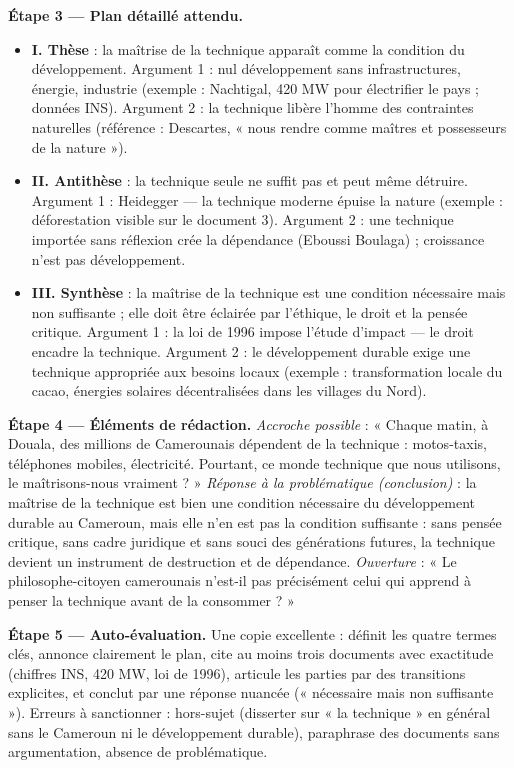 \documentclass[11pt]{article}
\begin{document}
\begin{exoresolu}
\textbf{Étape 3 — Plan détaillé attendu.}
\begin{itemize}
\item \textbf{I. Thèse} : la maîtrise de la technique apparaît comme la condition du développement. Argument 1 : nul développement sans infrastructures, énergie, industrie (exemple : Nachtigal, 420 MW pour électrifier le pays ; données INS). Argument 2 : la technique libère l'homme des contraintes naturelles (référence : Descartes, « nous rendre comme maîtres et possesseurs de la nature »).
\item \textbf{II. Antithèse} : la technique seule ne suffit pas et peut même détruire. Argument 1 : Heidegger — la technique moderne épuise la nature (exemple : déforestation visible sur le document 3). Argument 2 : une technique importée sans réflexion crée la dépendance (Eboussi Boulaga) ; croissance n'est pas développement.
\item \textbf{III. Synthèse} : la maîtrise de la technique est une condition nécessaire mais non suffisante ; elle doit être éclairée par l'éthique, le droit et la pensée critique. Argument 1 : la loi de 1996 impose l'étude d'impact — le droit encadre la technique. Argument 2 : le développement durable exige une technique appropriée aux besoins locaux (exemple : transformation locale du cacao, énergies solaires décentralisées dans les villages du Nord).
\end{itemize}

\textbf{Étape 4 — Éléments de rédaction.} \emph{Accroche possible} : « Chaque matin, à Douala, des millions de Camerounais dépendent de la technique : motos-taxis, téléphones mobiles, électricité. Pourtant, ce monde technique que nous utilisons, le maîtrisons-nous vraiment ? » \emph{Réponse à la problématique (conclusion)} : la maîtrise de la technique est bien une condition nécessaire du développement durable au Cameroun, mais elle n'en est pas la condition suffisante : sans pensée critique, sans cadre juridique et sans souci des générations futures, la technique devient un instrument de destruction et de dépendance. \emph{Ouverture} : « Le philosophe-citoyen camerounais n'est-il pas précisément celui qui apprend à penser la technique avant de la consommer ? »

\textbf{Étape 5 — Auto-évaluation.} Une copie excellente : définit les quatre termes clés, annonce clairement le plan, cite au moins trois documents avec exactitude (chiffres INS, 420 MW, loi de 1996), articule les parties par des transitions explicites, et conclut par une réponse nuancée (« nécessaire mais non suffisante »). Erreurs à sanctionner : hors-sujet (disserter sur « la technique » en général sans le Cameroun ni le développement durable), paraphrase des documents sans argumentation, absence de problématique.
\end{exoresolu}
\end{document}
